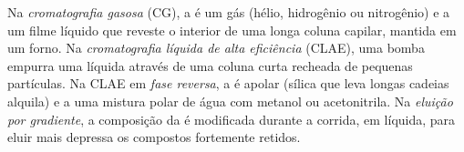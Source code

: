 \begin{definition}\label{def:b2:chromatography:techniques}
Na \emph{cromatografia gasosa} (CG), a  é um gás (hélio, hidrogênio ou
nitrogênio) e a  um filme líquido que reveste o interior de uma longa coluna capilar,
mantida em um forno. Na \emph{cromatografia líquida de alta eficiência}
(CLAE), uma bomba empurra uma  líquida através de uma coluna curta recheada de pequenas
partículas. Na CLAE em \emph{fase reversa}, a  é apolar
(sílica que leva longas cadeias alquila) e a  uma mistura polar de água com metanol ou
acetonitrila. Na \emph{eluição por gradiente}, a composição da  é
modificada durante a corrida, em  líquida, para eluir mais depressa os compostos
fortemente retidos.
\end{definition}

